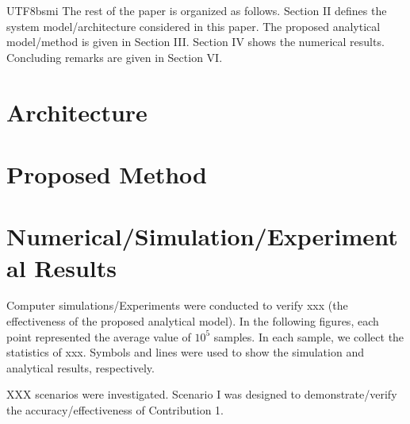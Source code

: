 \documentclass[conference]{IEEEtran}
\begin{document}
\begin{CJK}{UTF8}{bsmi}
The rest of the paper is organized as follows. Section II defines the system model/architecture considered in this paper. The proposed analytical model/method is given in Section III. Section IV shows the numerical results. Concluding remarks are given in Section VI.

{\color{blue}

\section{Architecture}




}

\section{Proposed Method}
\section{Numerical/Simulation/Experimental Results}
Computer simulations/Experiments were conducted to verify xxx (the effectiveness of the proposed analytical model). 
In the following figures, each point represented the average value of $10^5$ samples. In each sample, we collect the statistics of xxx. Symbols and lines were used to show the simulation and analytical results, respectively. 

XXX scenarios were investigated. Scenario I was designed to demonstrate/verify the accuracy/effectiveness of Contribution 1.


\end{CJK}
\end{document}
